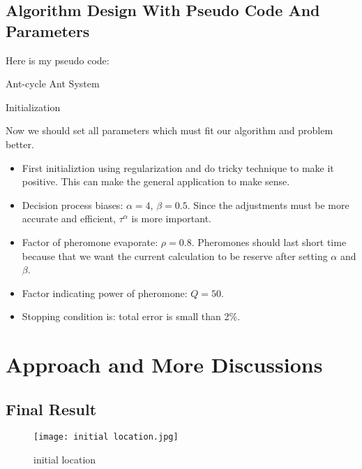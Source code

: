 \documentclass[lang=cn,a4paper,newtx]{elegantpaper}
\begin{document}
\subsection{Algorithm Design With Pseudo Code And Parameters}
Here is my pseudo code:
\par
\begin{algorithm}[H]
    \caption{Ant-cycle Ant System}
    Initialization\;
\end{algorithm}
\par
Now we should set all parameters which must fit our algorithm and problem better.
\begin{itemize}
  \item First initializtion using regularization and do tricky technique to make it positive.
  This can make the general application to make sense.
  \item Decision process biases: $\alpha = 4$, $\beta = 0.5$.
  Since the adjustments must be more accurate and efficient, $\tau^{\alpha}$ is more important.
  \item Factor of pheromone evaporate: $\rho = 0.8$.
  Pheromones should last short time because that we want the current calculation to be reserve after setting $\alpha$ and $\beta$.
  \item Factor indicating power of pheromone: $Q = 50$.
  \item Stopping condition is: total error is small than 2\%.
\end{itemize}

\section{Approach and More Discussions}
\subsection{Final Result}

\begin{figure}[htbp]
  \centering
  \texttt{[image: initial location.jpg]}
  \caption{initial location}
\end{figure}
\end{document}

